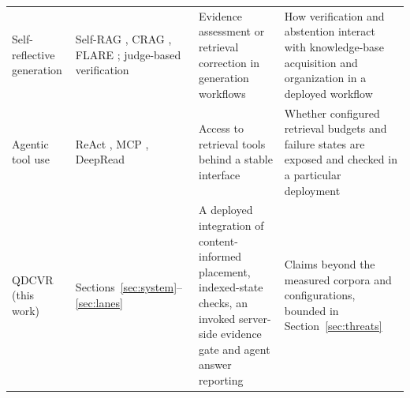 \begin{table}[t]
\begin{tabular}{@{}>{\raggedright\arraybackslash}p{}>{\raggedright\arraybackslash}p{}>{\raggedright\arraybackslash}p{}>{\raggedright\arraybackslash}p{}@{}}
Self-reflective generation & Self-RAG \citep{selfrag}, CRAG \citep{crag}, FLARE \citep{flare}; judge-based verification \citep{zheng-llmjudge,lightman-verify} & Evidence assessment or retrieval correction in generation workflows & How verification and abstention interact with knowledge-base acquisition and organization in a deployed workflow\\
Agentic tool use & ReAct \citep{react-yao}, MCP \citep{mcp}, DeepRead \citep{deepread} & Access to retrieval tools behind a stable interface & Whether configured retrieval budgets and failure states are exposed and checked in a particular deployment\\
\midrule
QDCVR (this work) & Sections~\ref{sec:system}--\ref{sec:lanes} & A deployed integration of content-informed placement, indexed-state checks, an invoked server-side evidence gate and agent answer reporting & Claims beyond the measured corpora and configurations, bounded in Section~\ref{sec:threats}\\
\bottomrule
\end{tabular}
\end{table}
